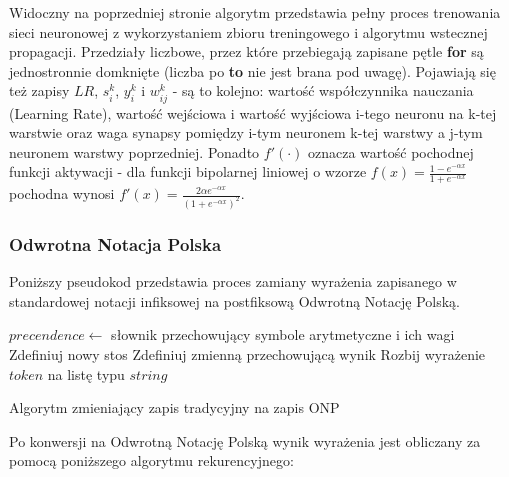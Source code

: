\documentclass[12pt,a4paper]{article}
\begin{document}
Widoczny na poprzedniej stronie algorytm przedstawia pełny proces trenowania sieci neuronowej z wykorzystaniem zbioru treningowego i algorytmu wstecznej propagacji. Przedziały liczbowe, przez które przebiegają zapisane pętle \textbf{for} są jednostronnie domknięte (liczba po \textbf{to} nie jest brana pod uwagę). Pojawiają się też zapisy $LR$, $s^k_i$, $y^k_i$ i $w^{k}_{ij}$ - są to kolejno: wartość współczynnika nauczania (Learning Rate), wartość wejściowa i wartość wyjściowa i-tego neuronu na k-tej warstwie oraz waga synapsy pomiędzy i-tym neuronem k-tej warstwy a j-tym neuronem warstwy poprzedniej. Ponadto $f'(\cdot)$ oznacza wartość pochodnej funkcji aktywacji - dla funkcji bipolarnej liniowej o wzorze $f(x) = \frac{1 - e^{-\alpha x}}{1 + e^{-\alpha x}}$ pochodna wynosi $f'(x) = \frac{2 \alpha e^{-\alpha x}}{(1 + e^{-\alpha x})^2}$.

\vspace{50pt}
\subsubsection*{Odwrotna Notacja Polska}
\hspace{20pt} Poniższy pseudokod przedstawia proces zamiany wyrażenia zapisanego w standardowej notacji infiksowej na postfiksową Odwrotną Notację Polską. \newline

\begin{algorithm}[H]
    $precendence \leftarrow$ słownik przechowujący symbole arytmetyczne i ich wagi\;
    Zdefiniuj nowy stos\;
    Zdefiniuj zmienną przechowującą wynik\;
    Rozbij wyrażenie $token$ na listę typu $string$\;
    {
    }
\vspace{10pt}
\caption{Algorytm zmieniający zapis tradycyjny na zapis ONP}
\end{algorithm}
    
    \newpage
    Po konwersji na Odwrotną Notację Polską wynik wyrażenia jest obliczany za pomocą poniższego algorytmu rekurencyjnego: \newline
    
\end{document}
